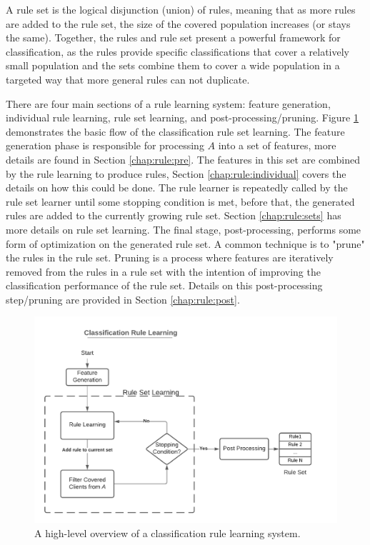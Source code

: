 A rule set is the logical disjunction (union) of rules, meaning that as more rules are added to the rule set, the size of the covered population increases (or stays the same). Together, the rules and rule set present a powerful framework for classification, as the rules provide specific classifications that cover a relatively small population and the sets combine them to cover a wide population in a targeted way that more general rules can not duplicate.


There are four main sections of a rule learning system: feature generation, individual rule learning, rule set learning, and post-processing/pruning. 
Figure \ref{fig:covering} demonstrates the basic flow of the classification rule set learning. The feature generation phase is responsible for processing $A$ into a set of features, more details are found in Section \ref{chap:rule:pre}. The features in this set are combined by the rule learning to produce rules, Section \ref{chap:rule:individual} covers the details on how this could be done. The rule learner is repeatedly called by the rule set learner until some stopping condition is met, before that, the generated rules are added to the currently growing rule set. Section \ref{chap:rule:sets} has more details on rule set learning. The final stage, post-processing, performs some form of optimization on the generated rule set. A common technique is to "prune" the rules in the rule set. Pruning is a process where features are iteratively removed from the rules in a rule set with the intention of improving the classification performance of the rule set. Details on this post-processing step/pruning are provided in Section \ref{chap:rule:post}.




\begin{figure}[h]
    \centering
    \includegraphics[width=1\textwidth]{Figures/Covering-Algorithm.pdf}
    \caption{A high-level overview of a classification rule learning system.}
		\label{fig:covering}
\end{figure}


